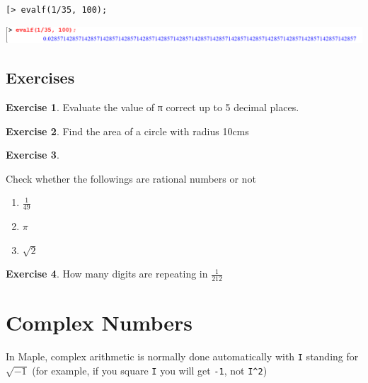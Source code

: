 \documentclass[
]{book}
\providecommand{\tightlist}{%
  \setlength{\itemsep}{0pt}\setlength{\parskip}{0pt}}
\theoremstyle{definition}
\theoremstyle{definition}
\theoremstyle{definition}
\newtheorem{exercise}{Exercise}[chapter]
\theoremstyle{definition}
\theoremstyle{remark}
\begin{document}
\begin{verbatim}
[> evalf(1/35, 100);
\end{verbatim}

\includegraphics{figures/Lesson 1/fig41.png}

\subsection{Exercises}\label{exercises-3}

\begin{exercise}
\protect\hypertarget{exr:unnamed-chunk-66}{}\label{exr:unnamed-chunk-66}Evaluate the value of π correct up to 5 decimal places.
\end{exercise}

\begin{exercise}
\protect\hypertarget{exr:unnamed-chunk-67}{}\label{exr:unnamed-chunk-67}Find the area of a circle with radius 10cms
\end{exercise}

\begin{exercise}
\protect\hypertarget{exr:unnamed-chunk-68}{}\label{exr:unnamed-chunk-68}

Check whether the followings are rational numbers or not

\begin{enumerate}
\def\labelenumi{\roman{enumi}.}
\tightlist
\item
  \(\frac{1}{49}\)
\item
  \(\pi\)
\item
  \(\sqrt{2}\)
\end{enumerate}

\end{exercise}

\begin{exercise}
\protect\hypertarget{exr:unnamed-chunk-69}{}\label{exr:unnamed-chunk-69}How many digits are repeating in \(\frac{1}{212}\)
\end{exercise}

\section{Complex Numbers}\label{complex-numbers-1}

In Maple, complex arithmetic is normally done automatically with \texttt{I} standing for \(\sqrt{−1}\) (for example, if you square \texttt{I} you will get \texttt{-1}, not \texttt{I\^{}2})
\end{document}
